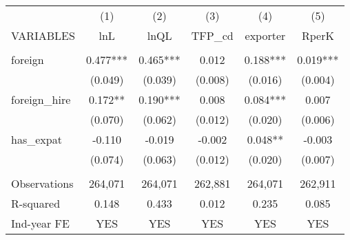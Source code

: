 \begin{tabular}{lccccc} \hline
 & (1) & (2) & (3) & (4) & (5) \\
VARIABLES & lnL & lnQL & TFP\_cd & exporter & RperK \\ \hline
 &  &  &  &  &  \\
foreign & 0.477*** & 0.465*** & 0.012 & 0.188*** & 0.019*** \\
 & (0.049) & (0.039) & (0.008) & (0.016) & (0.004) \\
foreign\_hire & 0.172** & 0.190*** & 0.008 & 0.084*** & 0.007 \\
 & (0.070) & (0.062) & (0.012) & (0.020) & (0.006) \\
has\_expat & -0.110 & -0.019 & -0.002 & 0.048** & -0.003 \\
 & (0.074) & (0.063) & (0.012) & (0.020) & (0.007) \\
 &  &  &  &  &  \\
Observations & 264,071 & 264,071 & 262,881 & 264,071 & 262,911 \\
R-squared & 0.148 & 0.433 & 0.012 & 0.235 & 0.085 \\
 Ind-year FE & YES & YES & YES & YES & YES \\ \hline
\end{tabular}
